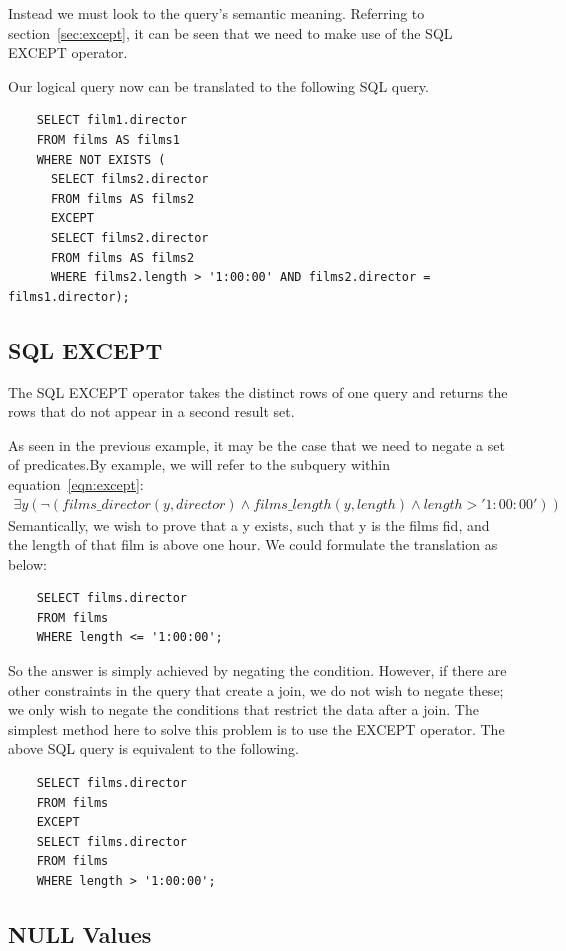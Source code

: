 \documentclass[a4paper, 11pt]{article}
\begin{document}
    Instead we must look to the query's semantic meaning. Referring to
    section~\ref{sec:except}, it can be seen that we need to make use of the
    SQL EXCEPT operator.

    Our logical query now can be translated to the following SQL query.
    \begin{verbatim}
    SELECT film1.director
    FROM films AS films1
    WHERE NOT EXISTS (
      SELECT films2.director
      FROM films AS films2
      EXCEPT
      SELECT films2.director
      FROM films AS films2
      WHERE films2.length > '1:00:00' AND films2.director = films1.director);
    \end{verbatim}

  \subsection{SQL EXCEPT}
    The SQL EXCEPT operator takes the distinct rows of one query and returns
    the rows that do not appear in a second result set.\cite{wiki:EXCEPT}

    As seen in the previous example, it may be the case that we need to negate
    a set of predicates.By example, we will refer to the subquery within
    equation~\ref{eqn:except}:
    \begin{multline}
    \exists y(\lnot(films\_director(y,
      director) \land films\_length(y, length) \land length > '1:00:00'))
    \end{multline}
    Semantically, we wish to prove that a y exists, such that y is the films
    fid, and the length of that film is above one hour. We could formulate the
    translation as below:
    \begin{verbatim}
    SELECT films.director
    FROM films
    WHERE length <= '1:00:00';
    \end{verbatim}
    So the answer is simply achieved by negating the condition. However, if
    there are other constraints in the query that create a join, we do not wish
    to negate these; we only wish to negate the conditions that restrict the
    data after a join. The simplest method here to solve this problem is to use
    the EXCEPT operator. The above SQL query is equivalent to the following.
    \begin{verbatim}
    SELECT films.director
    FROM films
    EXCEPT
    SELECT films.director
    FROM films
    WHERE length > '1:00:00';
    \end{verbatim}

  \subsection{NULL Values}
\end{document}
